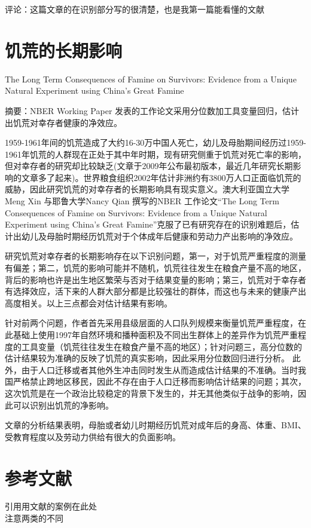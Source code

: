 \documentclass{article}
\begin{document}
\par 评论：这篇文章的在识别部分写的很清楚，也是我第一篇能看懂的文献


\newpage
\section{饥荒的长期影响}
The Long Term Consequences of Famine on Survivors: Evidence from a Unique Natural Experiment using China's Great Famine
\par 摘要：NBER Working Paper 发表的工作论文采用分位数加工具变量回归，估计出饥荒对幸存者健康的净效应\citep{meng_long_2009}。
\par 1959-1961年间的饥荒造成了大约16-30万中国人死亡，幼儿及母胎期间经历过1959-1961年饥荒的人群现在正处于其中年时期，现有研究侧重于饥荒对死亡率的影响，但对幸存者的研究却比较缺乏(文章于2009年公布最初版本，最近几年研究长期影响的文章多了起来)。世界粮食组织2002年估计非洲约有3800万人口正面临饥荒的威胁，因此研究饥荒的对幸存者的长期影响具有现实意义。澳大利亚国立大学 Meng Xin 与耶鲁大学Nancy Qian 撰写的NBER 工作论文“The Long Term Consequences of Famine on Survivors: Evidence from a Unique Natural Experiment using China's Great Famine”克服了已有研究存在的识别难题后，估计出幼儿及母胎时期经历饥荒对于个体成年后健康和劳动力产出影响的净效应。
\par 研究饥荒对幸存者的长期影响存在以下识别问题，第一，对于饥荒严重程度的测量有偏差；第二，饥荒的影响可能并不随机，饥荒往往发生在粮食产量不高的地区，背后的影响也许是出生地区繁荣与否对于结果变量的影响；第三，饥荒对于幸存者有选择效应，活下来的人群大部分都是比较强壮的群体，而这也与未来的健康产出高度相关。以上三点都会对估计结果有影响。
\par 针对前两个问题，作者首先采用县级层面的人口队列规模来衡量饥荒严重程度，在此基础上使用1997年自然环境和播种面积及不同出生群体上的差异作为饥荒严重程度的工具变量（饥荒往往发生在粮食产量不高的地区）；针对问题三，高分位数的估计结果较为准确的反映了饥荒的真实影响，因此采用分位数回归进行分析。
此外，由于人口迁移或者其他外生冲击同时发生从而造成估计结果的不准确。当时我国严格禁止跨地区移民，因此不存在由于人口迁移而影响估计结果的问题；其次，这次饥荒是在一个政治比较稳定的背景下发生的，并无其他类似于战争的影响，因此可以识别出饥荒的净影响。
\par 文章的分析结果表明，母胎或者幼儿时期经历饥荒对成年后的身高、体重、BMI、受教育程度以及劳动力供给有很大的负面影响。



%
%
%



\newpage
\section{参考文献}
引用用文献的案例在此处\citet{di_maio_2019}
\\ \citep{di_maio_2019}  注意两类的不同


\end{document}
